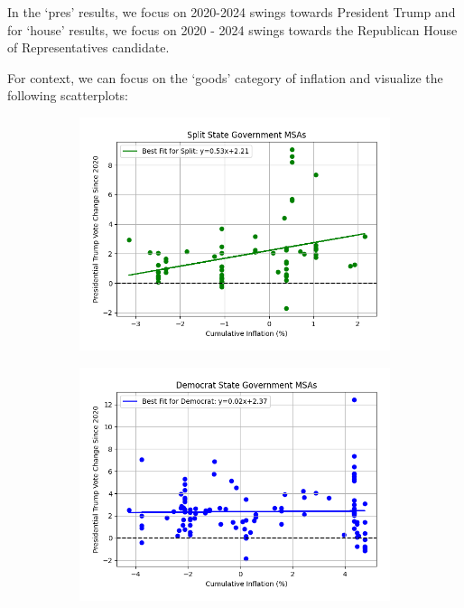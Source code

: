 \documentclass{article}
\begin{document}
In the `pres' results, we focus on 2020-2024 swings towards President Trump and for `house' results, we focus on 2020 - 2024 swings towards the Republican House of Representatives candidate. 





For context, we can focus on the `goods' category of inflation and visualize the following scatterplots:

\begin{figure}[ht]
\centering
\begin{subfigure}[b]{0.4\textwidth}
    \centering
    \includegraphics[width=\textwidth]{pres_goods_Split_msa_swing_scatter.png}
\end{subfigure}
\begin{subfigure}[b]{0.4\textwidth}
    \centering
    \includegraphics[width=\textwidth]{pres_goods_D_msa_swing_scatter.png}
\end{subfigure}


\end{figure}
\end{document}

